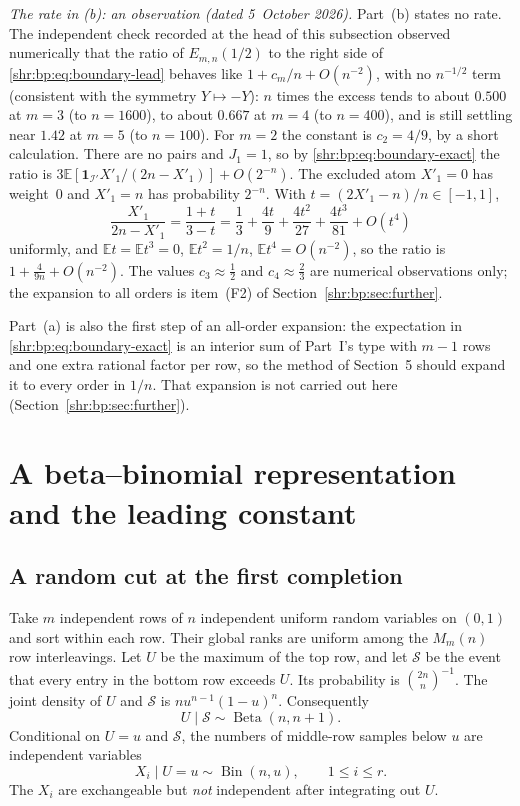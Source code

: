 \documentclass[11pt,letterpaper]{article}
\numberwithin{equation}{section}
\theoremstyle{definition}
\newcommand{\E}{\mathbb E}
\newcommand{\1}{\mathbf 1}
\newcommand{\ind}{\mathbf 1}
\begin{document}
\emph{The rate in (b): an observation (dated 5~October 2026).}
Part~(b) states no rate. The independent check recorded at the head of
this subsection observed numerically that the ratio of $E_{m,n}(1/2)$ to
the right side of \eqref{shr:bp:eq:boundary-lead} behaves like
$1+c_m/n+O(n^{-2})$, with no
$n^{-1/2}$ term (consistent with the symmetry $Y\mapsto-Y$):
$n$ times the excess tends to about $0.500$ at $m=3$ (to $n=1600$), to
about $0.667$ at $m=4$ (to $n=400$), and is still settling near $1.42$ at
$m=5$ (to $n=100$). For $m=2$ the constant is $c_2=4/9$, by a short
calculation. There are no pairs and $J_1=1$, so by
\eqref{shr:bp:eq:boundary-exact} the ratio is
$3\E[\ind_{\mathcal I'}X'_1/(2n-X'_1)]+O(2^{-n})$. The excluded atom
$X'_1=0$ has weight~$0$ and $X'_1=n$ has probability $2^{-n}$. With
$t=(2X'_1-n)/n\in[-1,1]$,
\[
 \frac{X'_1}{2n-X'_1}=\frac{1+t}{3-t}
 =\frac13+\frac{4t}9+\frac{4t^2}{27}+\frac{4t^3}{81}+O(t^4)
\]
uniformly, and $\E t=\E t^3=0$, $\E t^2=1/n$, $\E t^4=O(n^{-2})$, so the
ratio is $1+\frac4{9n}+O(n^{-2})$. The values $c_3\approx\frac12$ and
$c_4\approx\frac23$ are numerical observations only; the expansion to all
orders is item~(F2) of Section~\ref{shr:bp:sec:further}.

Part~(a) is also the first step of an
all-order expansion: the expectation in
\eqref{shr:bp:eq:boundary-exact} is an interior sum of Part~I's type with
$m-1$ rows and one extra rational factor per row, so the method of
Section~5 should expand it to every order in $1/n$. That expansion is not
carried out here (Section~\ref{shr:bp:sec:further}).

\section{A beta--binomial representation and the leading constant}
\label{shr:bp:sec:beta}

\subsection{A random cut at the first completion}
Take $m$ independent rows of $n$ independent uniform random variables on
$(0,1)$ and sort within each row. Their global ranks are uniform among
the $M_m(n)$ row interleavings. Let $U$ be the maximum of the top row,
and let $\mathcal S$ be the event that every entry in the bottom row
exceeds $U$. Its probability is $\binom{2n}{n}^{-1}$.
The joint density of $U$ and $\mathcal S$ is
$n u^{n-1}(1-u)^n$. Consequently
\begin{equation}
 U\mid\mathcal S\sim\operatorname{Beta}(n,n+1).
 \label{shr:bp:eq:betaU}
\end{equation}
Conditional on $U=u$ and $\mathcal S$, the numbers of middle-row samples
below $u$ are independent variables
\begin{equation}
 X_i\mid U=u\sim\operatorname{Bin}(n,u),\qquad 1\le i\le r.
 \label{shr:bp:eq:X}
\end{equation}
The $X_i$ are exchangeable but \emph{not} independent after integrating
out $U$.
\end{document}
